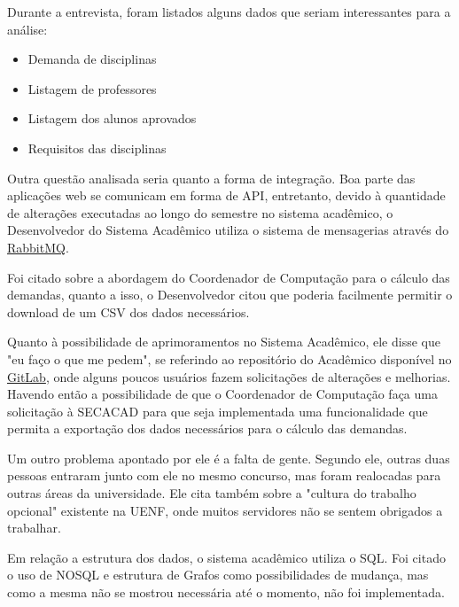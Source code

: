         Durante a entrevista, foram listados alguns dados que seriam interessantes para a análise:

        \begin{itemize}
            \item Demanda de disciplinas
            \item Listagem de professores
            \item Listagem dos alunos aprovados
            \item Requisitos das disciplinas
        \end{itemize}


        Outra questão analisada seria quanto a forma de integração. Boa parte das aplicações web se comunicam em forma de API, entretanto, devido à quantidade de alterações executadas ao longo do semestre no sistema acadêmico, o Desenvolvedor do Sistema Acadêmico utiliza o sistema de mensagerias através do \href{https://www.rabbitmq.com/}{RabbitMQ}.

        Foi citado sobre a abordagem do Coordenador de Computação para o cálculo das demandas, quanto a isso, o Desenvolvedor citou que poderia facilmente permitir o download de um CSV dos dados necessários.

        Quanto à possibilidade de aprimoramentos no Sistema Acadêmico, ele disse que "eu faço o que me pedem", se referindo ao repositório do Acadêmico disponível no \href{https://about.gitlab.com/}{GitLab}, onde alguns poucos usuários fazem solicitações de alterações e melhorias. Havendo então a possibilidade de que o Coordenador de Computação faça uma solicitação à SECACAD para que seja implementada uma funcionalidade que permita a exportação dos dados necessários para o cálculo das demandas.

        Um outro problema apontado por ele é a falta de gente. Segundo ele, outras duas pessoas entraram junto com ele no mesmo concurso, mas foram realocadas para outras áreas da universidade. Ele cita também sobre a "cultura do trabalho opcional" existente na UENF, onde muitos servidores não se sentem obrigados a trabalhar.

        Em relação a estrutura dos dados, o sistema acadêmico utiliza o SQL. Foi citado o uso de NOSQL e estrutura de Grafos como possibilidades de mudança, mas como a mesma não se mostrou necessária até o momento, não foi implementada.

